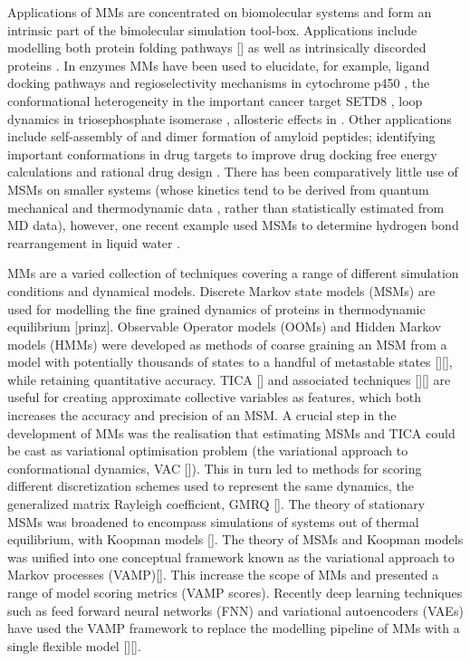 Applications of MMs are concentrated on biomolecular systems and form an intrinsic part of the bimolecular simulation tool-box\cite{hugginsBiomolecularSimulationsDynamics2019}. Applications include modelling both protein folding pathways [] as well as intrinsically discorded proteins \cite{schorAnalyticalMethodsStructural2016a}. In enzymes MMs have been used to elucidate, for example, ligand docking pathways \cite{ahalawatMappingSubstrateRecognition2018a} and regioselectivity mechanisms in cytochrome p450  \cite{dodaniDiscoveryRegioselectivitySwitch2016a}, the conformational heterogeneity in the important cancer target SETD8 \cite{chenDynamicConformationalLandscape2019a}, loop dynamics in  triosephosphate isomerase \cite{LoopMotionTriosephosphate}, allosteric effects in \cite{wapeesittipanAllostericEffectsCyclophilin2019}. Other applications include self-assembly of  \cite{senguptaAutomatedMarkovState2019} and dimer formation \cite{leahyCoarseMasterEquations2016} of amyloid peptides; identifying important conformations in drug targets to improve drug docking free energy calculations  \cite{amaroEnsembleDockingDrug2018} and rational drug design \cite{gervasioBiomolecularSimulationsStructureBased2019}. There has been comparatively little use of MSMs on smaller systems (whose kinetics tend to be derived from quantum mechanical and thermodynamic data \cite{glowackiMESMEROpenSourceMaster2012}, rather than statistically estimated from MD data), however, one recent example used MSMs to determine hydrogen bond rearrangement in liquid water \cite{schulzCollectiveHydrogenbondRearrangement2018}. 

MMs are a varied collection of techniques covering a range of different simulation conditions and dynamical models. Discrete Markov state models (MSMs) are used for modelling the fine grained dynamics of proteins in thermodynamic equilibrium [prinz].  Observable Operator models (OOMs) and Hidden Markov models (HMMs) were developed as methods of coarse graining an MSM from a model with potentially thousands of states to a handful of metastable states [][], while retaining quantitative accuracy. TICA [] and associated techniques [][] are useful for creating approximate collective variables as features, which both increases the accuracy and precision of an MSM. A crucial step in the development of MMs was the realisation that estimating MSMs and TICA could be cast as variational optimisation problem (the variational approach to conformational dynamics, VAC []). This in turn led to methods for scoring different discretization schemes used to represent the same dynamics, the generalized matrix Rayleigh coefficient, GMRQ []. The theory of stationary MSMs was broadened to encompass simulations of systems out of thermal equilibrium, with Koopman models []. The theory of MSMs and Koopman models was unified into one conceptual framework known as the variational approach to Markov processes (VAMP)[]. This increase the scope of MMs and presented a range of model scoring metrics (VAMP scores). Recently deep learning techniques such as feed forward neural networks (FNN) and variational autoencoders (VAEs) have used the VAMP framework to replace the modelling pipeline of MMs with a single flexible model [][]. 

